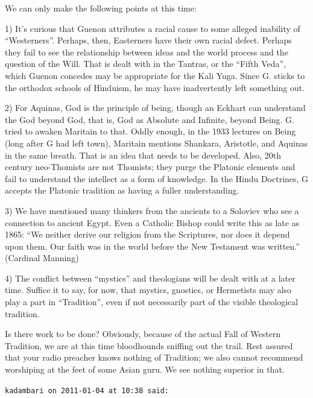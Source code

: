 \begin{footnotesize}
\begin{sffamily}
We can only make the following points at this time:

1) It's curious that Guenon attributes a racial cause to some alleged inability of ``Westerners''. Perhaps, then, Easterners have their own racial defect. Perhaps they fail to see the relationship between ideas and the world process and the question of the Will. That is dealt with in the Tantras, or the ``Fifth Veda'', which Guenon concedes may be appropriate for the Kali Yuga. Since G. sticks to the orthodox schools of Hinduism, he may have inadvertently left something out.

2) For Aquinas, God is the principle of being, though an Eckhart can understand the God beyond God, that is, God as Absolute and Infinite, beyond Being. G. tried to awaken Maritain to that. Oddly enough, in the 1933 lectures on Being (long after G had left town), Maritain mentions Shankara, Aristotle, and Aquinas in the same breath. That is an idea that needs to be developed. Also, 20th century neo-Thomists are not Thomists; they purge the Platonic elements and fail to understand the intellect as a form of knowledge. In the Hindu Doctrines, G accepts the Platonic tradition as having a fuller understanding.

3) We have mentioned many thinkers from the ancients to a Soloviev who see a connection to ancient Egypt. Even a Catholic Bishop could write this as late as 1865: ``We neither derive our religion from the Scriptures, nor does it depend upon them. Our faith was in the world before the New Testament was written.'' (Cardinal Manning)

4) The conflict between ``mystics'' and theologians will be dealt with at a later time. Suffice it to say, for now, that mystics, gnostics, or Hermetists may also play a part in ``Tradition'', even if not necessarily part of the visible theological tradition.

Is there work to be done? Obviously, because of the actual Fall of Western Tradition, we are at this time bloodhounds sniffing out the trail. Rest assured that your radio preacher knows nothing of Tradition; we also cannot recommend worshiping at the feet of some Asian guru. We see nothing superior in that.

\hfill

\texttt{kadambari on 2011-01-04 at 10:38 said:}


\end{sffamily}
\end{footnotesize}

